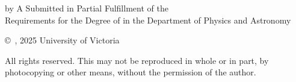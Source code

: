 \pagebreak
{
	\centering
	\thesistitle
	\tpbreak
	by
	\tpbreak
	\nameanddegrees
	\tpbreak
	A \PhDorMas Submitted in Partial Fulfillment of the \\
	Requirements for the Degree of
	\tpbreak
	\PhDorMaster
	\tpbreak
	in the Department of Physics and Astronomy\\
	\vfill
	\begin{center}
		\copyright\ \yourname, 2025 \linebreak
		\phantom{\copyright} University of Victoria
	\end{center}

	All rights reserved. This \PhDorMas may not be reproduced in whole or in part, by photocopying or other means, without the permission of the author.\hfill    
}
\pagebreak
